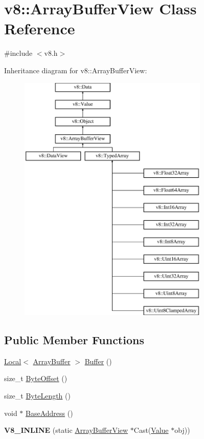 \hypertarget{classv8_1_1_array_buffer_view}{}\section{v8\+:\+:Array\+Buffer\+View Class Reference}
\label{classv8_1_1_array_buffer_view}


{\ttfamily \#include $<$v8.\+h$>$}

Inheritance diagram for v8\+:\+:Array\+Buffer\+View\+:\begin{figure}[H]
\begin{center}
\leavevmode
\includegraphics[height=12.000000cm]{classv8_1_1_array_buffer_view}
\end{center}
\end{figure}
\subsection*{Public Member Functions}
\begin{DoxyCompactItemize}
\item 
\hyperlink{classv8_1_1_local}{Local}$<$ \hyperlink{classv8_1_1_array_buffer}{Array\+Buffer} $>$ \hyperlink{classv8_1_1_array_buffer_view_a2ceba3908fbf98ecc81702083127b046}{Buffer} ()
\item 
size\+\_\+t \hyperlink{classv8_1_1_array_buffer_view_a4739a31269f5ebc5b88a708b9429c688}{Byte\+Offset} ()
\item 
size\+\_\+t \hyperlink{classv8_1_1_array_buffer_view_a9fc7563c97e0b639a6c0a3274995bb3c}{Byte\+Length} ()
\item 
void $\ast$ \hyperlink{classv8_1_1_array_buffer_view_ab4c803d2b1fe5dcd2e593014d576e3f3}{Base\+Address} ()
\item 
\hypertarget{classv8_1_1_array_buffer_view_a11090a6ac2d5715b5abb1ecaf2df7e79}{}{\bfseries V8\+\_\+\+I\+N\+L\+I\+N\+E} (static \hyperlink{classv8_1_1_array_buffer_view}{Array\+Buffer\+View} $\ast$Cast(\hyperlink{classv8_1_1_value}{Value} $\ast$obj))\label{classv8_1_1_array_buffer_view_a11090a6ac2d5715b5abb1ecaf2df7e79}

\end{DoxyCompactItemize}
